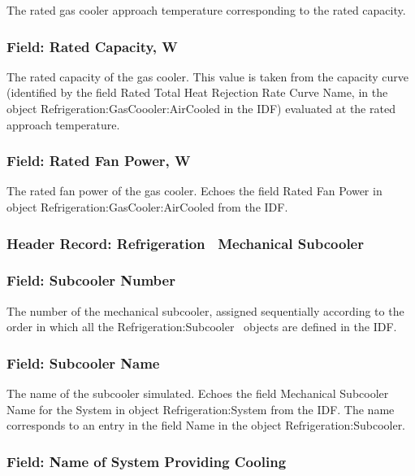 The rated gas cooler approach temperature corresponding to the rated capacity.

\subsubsection{Field: Rated Capacity, W}\label{field-rated-capacity-w-4}

The rated capacity of the gas cooler. This value is taken from the capacity curve (identified by the field Rated Total Heat Rejection Rate Curve Name, in the object Refrigeration:GasCoooler:AirCooled in the IDF) evaluated at the rated approach temperature.

\subsubsection{Field: Rated Fan Power, W}\label{field-rated-fan-power-w-2}

The rated fan power of the gas cooler. Echoes the field Rated Fan Power in object Refrigeration:GasCooler:AirCooled from the IDF.

\subsubsection{Header Record: Refrigeration~ Mechanical Subcooler}\label{header-record-refrigeration-mechanical-subcooler}

\subsubsection{Field: Subcooler Number}\label{field-subcooler-number-1}

The number of the mechanical subcooler, assigned sequentially according to the order in which all the Refrigeration:Subcooler~ objects are defined in the IDF.

\subsubsection{Field: Subcooler Name}\label{field-subcooler-name-1}

The name of the subcooler simulated. Echoes the field Mechanical Subcooler Name for the System in object Refrigeration:System from the IDF. The name corresponds to an entry in the field Name in the object Refrigeration:Subcooler.

\subsubsection{Field: Name of System Providing Cooling}\label{field-name-of-system-providing-cooling}

